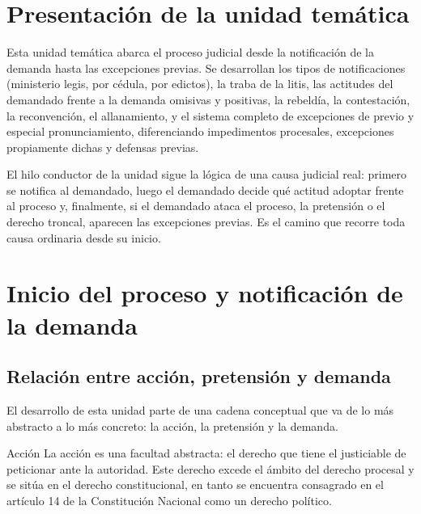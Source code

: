 \documentclass[12pt,oneside]{book}
\begin{document}
\tableofcontents

\chapter*{Presentación de la unidad temática}

Esta unidad temática abarca el proceso judicial desde la notificación de la demanda hasta las excepciones previas. Se desarrollan los tipos de notificaciones (ministerio legis, por cédula, por edictos), la traba de la litis, las actitudes del demandado frente a la demanda \textemdash{}omisivas y positivas\textemdash{}, la rebeldía, la contestación, la reconvención, el allanamiento, y el sistema completo de excepciones de previo y especial pronunciamiento, diferenciando impedimentos procesales, excepciones propiamente dichas y defensas previas.

El hilo conductor de la unidad sigue la lógica de una causa judicial real: primero se notifica al demandado, luego el demandado decide qué actitud adoptar frente al proceso y, finalmente, si el demandado ataca el proceso, la pretensión o el derecho troncal, aparecen las excepciones previas. Es el camino que recorre toda causa ordinaria desde su inicio.

\chapter{Inicio del proceso y notificación de la demanda}

\section{Relación entre acción, pretensión y demanda}

El desarrollo de esta unidad parte de una cadena conceptual que va de lo más abstracto a lo más concreto: la acción, la pretensión y la demanda.

\begin{definition}{Acción}
La acción es una facultad abstracta: el derecho que tiene el justiciable de peticionar ante la autoridad. Este derecho excede el ámbito del derecho procesal y se sitúa en el derecho constitucional, en tanto se encuentra consagrado en el artículo 14 de la Constitución Nacional como un derecho político.
\end{definition}
\end{document}
